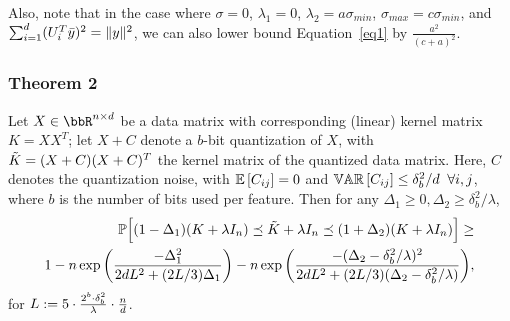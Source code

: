 \documentclass[12pt]{article}
\begin{document}
Also, note that in the case where $\sigma = 0$, $\lambda_1 = 0$, $\lambda_2 = a \sigma_{min}$, $\sigma_{max} = c\sigma_{min}$, and $\sum_{i=1}^d (U_i^T \by)^2 = \|y\|^2$, we can also lower bound Equation~\eqref{eq1} by $\frac{a^2}{(c+a)^2}$.

\subsubsection{Theorem 2}

\begin{theorem}
	\label{thm2}
	Let $X \in \RR^{n\times d}$ be a data matrix with corresponding (linear) kernel matrix $K = XX^T$; let $X+C$ denote a $b$-bit quantization of $X$, with $\tK = (X+C)(X+C)^T$ the kernel matrix of the quantized data matrix. Here, $C$ denotes the quantization noise, with $\expect{}{C_{ij}} = 0$ and $\var{}{C_{ij}} \leq \delta_b^2/d \;\;\forall i,j$, where $b$ is the number of bits used per feature.
	Then for any $\Delta_1 \geq 0, \Delta_2 \geq \delta^2_b/\lambda$,
	\begin{eqnarray}
	\Prob\Big[(1 - \Delta_1) (K + \lambda I_n) \preceq \tK + \lambda I_n \preceq (1 + \Delta_2) (K + \lambda I_n)
	\Big] 
	\geq \\ 1 - 
	n \exp \bigg(\frac{-\Delta_1^2}{2dL^2 + (2L/3)\Delta_1}\bigg) -
	n \exp \bigg(\frac{-(\Delta_2-\delta_b^2/\lambda)^2}{2dL^2 + (2L/3)(\Delta_2-\delta_b^2/\lambda)}\bigg),
	\end{eqnarray}
	for $L \defeq 5 \cdot \frac{2^b \cdot \delta_b^2}{\lambda}\cdot \frac{n}{d}$.
\end{theorem}


\end{document}
